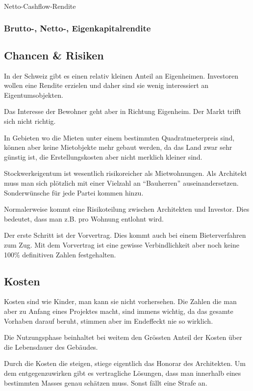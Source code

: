 \documentclass[11pt]{article}
\begin{document}
Netto-Cashflow-Rendite

\subsubsection{Brutto-, Netto-, Eigenkapitalrendite}
\label{sec-2-3-3}

\subsection{Chancen \& Risiken}
\label{sec-2-4}

In der Schweiz gibt es einen relativ kleinen Anteil an
Eigenheimen. Investoren wollen eine Rendite erzielen und daher sind sie wenig
interessiert an Eigentumsobjekten.

Das Interesse der Bewohner geht aber in Richtung Eigenheim. Der Markt trifft
sich nicht richtig.

In Gebieten wo die Mieten unter einem bestimmten Quadratmeterpreis sind,
können aber keine Mietobjekte mehr gebaut werden, da das Land zwar sehr
günstig ist, die Erstellungskosten aber nicht merklich kleiner sind.

Stockwerkeigentum ist wesentlich risikoreicher als Mietwohnungen. Als
Architekt muss man sich plötzlich mit einer Vielzahl an "`Bauherren"'
auseinandersetzen. Sonderwünsche für jede Partei kommen hinzu.

Normalerweise kommt eine Risikoteilung zwischen Architekten und
Investor. Dies bedeutet, dass man z.B. pro Wohnung entlohnt wird.

Der erste Schritt ist der Vorvertrag. Dies kommt auch bei einem
Bieterverfahren zum Zug. Mit dem Vorvertrag ist eine gewisse Verbindlichkeit
aber noch keine 100\% definitiven Zahlen festgehalten.

\subsection{Kosten}
\label{sec-2-5}

Kosten sind wie Kinder, man kann sie nicht vorhersehen. Die Zahlen die man
aber zu Anfang eines Projektes macht, sind immens wichtig, da das gesamte
Vorhaben darauf beruht, stimmen aber im Endeffeckt nie so wirklich.

Die Nutzungsphase beinhaltet bei weitem den Grössten Anteil der Kosten über
die Lebensdauer des Gebäudes.

Durch die Kosten die steigen, stiege eigentlich das Honorar des
Architekten. Um dem entgegenzuwirken gibt es vertragliche Lösungen, dass man
innerhalb eines bestimmten Masses genau schätzen muss. Sonst fällt eine
Strafe an.
\end{document}

